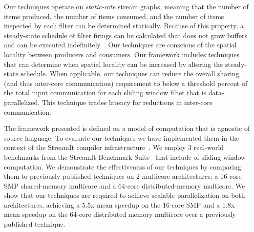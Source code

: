 Our techniques operate on {\it static-rate} stream graphs, meaning
that the number of items produced, the number of items consumed, and
the number of items inspected by each filter can be determined
statically.  Because of this property, a steady-state schedule of
filter firings can be calculated that does not grow buffers and can be
executed indefinitely~\cite{lee87}.  Our techniques are conscious of
the spatial locality between producers and consumers.  Our framework
includes techniques that can determine when spatial locality can be
increased by altering the steady-state schedule.  When applicable, our
techniques can reduce the overall sharing (and thus inter-core
communication) requirement to below a threshold percent of the total
input communication for each sliding window filter that is
data-parallelized.  This technique trades latency for reductions in
inter-core communication.

The framework presented is defined on a model of computation that is
agnostic of source language.  To evaluate our techniques we have
implemented them in the context of the StreamIt compiler
infrastructure~\cite{gordon-asplos06}.  We employ 3 real-world
benchmarks from the StreamIt Benchmark Suite~\cite{streamit-suite}
that include of sliding window computation.  We demonstrate the
effectiveness of our techniques by comparing them to previously
published techniques on 2 multicore architectures: a 16-core SMP
shared-memory multicore and a 64-core distributed-memory multicore.
We show that our techniques are required to achieve scalable
parallelization on both architectures, achieving a 5.5x mean speedup
on the 16-core SMP and a 1.8x mean speedup on the 64-core distributed
memory multicore over a previously published technique.


